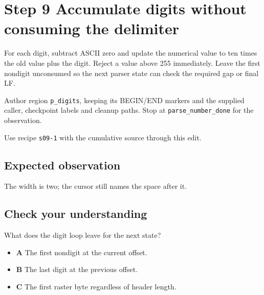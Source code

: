 \section{Step 9 Accumulate digits without consuming the delimiter}\label{ppm-s09}

For each digit, subtract ASCII zero and update the numerical value to ten times the old value plus the digit. Reject a value above 255 immediately. Leave the first nondigit unconsumed so the next parser state can check the required gap or final LF.

Author region \texttt{p\_digits}, keeping its BEGIN/END markers and the supplied caller, checkpoint labels and cleanup paths. Stop at \texttt{parse\_number\_done} for the observation.

Use recipe \texttt{s09-1} with the cumulative source through this edit.

\subsection{Expected observation}
The width is two; the cursor still names the space after it.

\subsection{Check your understanding}
What does the digit loop leave for the next state?

\begin{itemize}
  \item \textbf{A} The first nondigit at the current offset.
  \item \textbf{B} The last digit at the previous offset.
  \item \textbf{C} The first raster byte regardless of header length.
\end{itemize}
